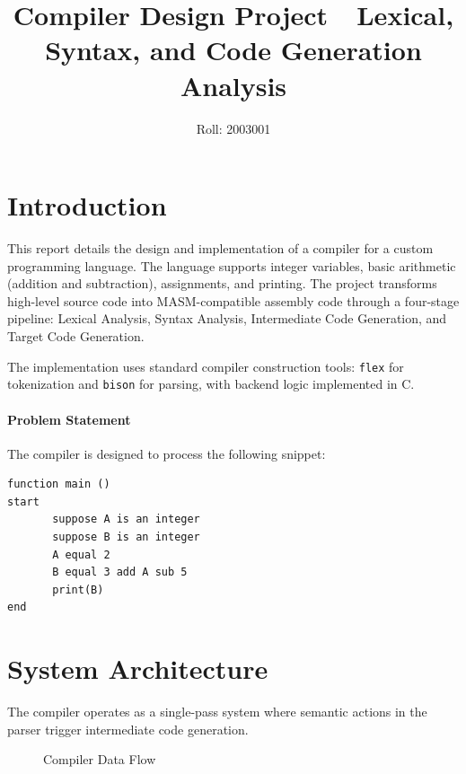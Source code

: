 \documentclass[12pt,a4paper]{article}
\title{\textbf{Compiler Design Project}\ \ \large Lexical, Syntax, and Code Generation Analysis}
\author{Roll: 2003001}
\date{}
\begin{document}
\maketitle
\tableofcontents
\newpage

\section{Introduction}
This report details the design and implementation of a compiler for a custom programming language. The language supports integer variables, basic arithmetic (addition and subtraction), assignments, and printing. The project transforms high-level source code into MASM-compatible assembly code through a four-stage pipeline: Lexical Analysis, Syntax Analysis, Intermediate Code Generation, and Target Code Generation.

The implementation uses standard compiler construction tools: \texttt{flex} for tokenization and \texttt{bison} for parsing, with backend logic implemented in C.

\paragraph{Problem Statement}
The compiler is designed to process the following snippet:
\begin{lstlisting}[language={}]
function main ()
start
       suppose A is an integer
       suppose B is an integer
       A equal 2
       B equal 3 add A sub 5
       print(B)
end
\end{lstlisting}

\section{System Architecture}
The compiler operates as a single-pass system where semantic actions in the parser trigger intermediate code generation.

\begin{figure}[H]
  \centering
  \caption{Compiler Data Flow}
  \label{fig:pipeline}
\end{figure}
\end{document}

